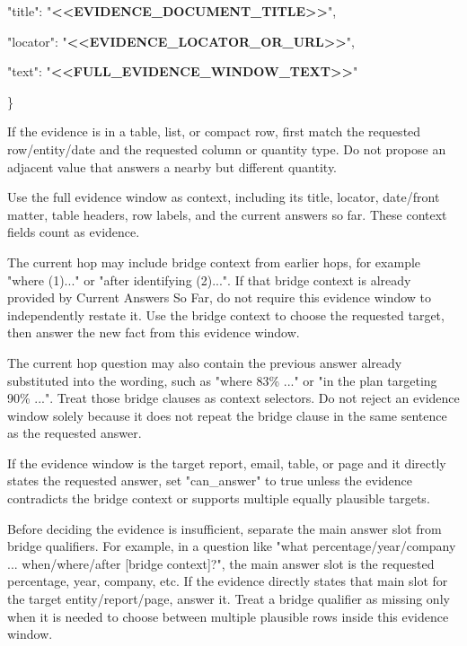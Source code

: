 \begin{tcolorbox}
\begin{scriptsize}
  "title": "\textcolor{my-green}{\textbf{\textless{}\textless{}EVIDENCE\_DOCUMENT\_TITLE\textgreater{}\textgreater{}}}",\par
  "locator": "\textcolor{my-green}{\textbf{\textless{}\textless{}EVIDENCE\_LOCATOR\_OR\_URL\textgreater{}\textgreater{}}}",\par
  "text": "\textcolor{my-green}{\textbf{\textless{}\textless{}FULL\_EVIDENCE\_WINDOW\_TEXT\textgreater{}\textgreater{}}}"\par
\}\par
\mbox{}\par
If the evidence is in a table, list, or compact row, first match the requested row/entity/date and the requested column or quantity type. Do not propose an adjacent value that answers a nearby but different quantity.\par
Use the full evidence window as context, including its title, locator, date/front matter, table headers, row labels, and the current answers so far. These context fields count as evidence.\par
The current hop may include bridge context from earlier hops, for example "where (1)..." or "after identifying (2)...". If that bridge context is already provided by Current Answers So Far, do not require this evidence window to independently restate it. Use the bridge context to choose the requested target, then answer the new fact from this evidence window.\par
The current hop question may also contain the previous answer already substituted into the wording, such as "where 83\% ..." or "in the plan targeting 90\% ...". Treat those bridge clauses as context selectors. Do not reject an evidence window solely because it does not repeat the bridge clause in the same sentence as the requested answer.\par
If the evidence window is the target report, email, table, or page and it directly states the requested answer, set "can\_answer" to true unless the evidence contradicts the bridge context or supports multiple equally plausible targets.\par
Before deciding the evidence is insufficient, separate the main answer slot from bridge qualifiers. For example, in a question like "what percentage/year/company ... when/where/after [bridge context]?", the main answer slot is the requested percentage, year, company, etc. If the evidence directly states that main slot for the target entity/report/page, answer it. Treat a bridge qualifier as missing only when it is needed to choose between multiple plausible rows inside this evidence window.\par

\end{scriptsize}
\end{tcolorbox}
